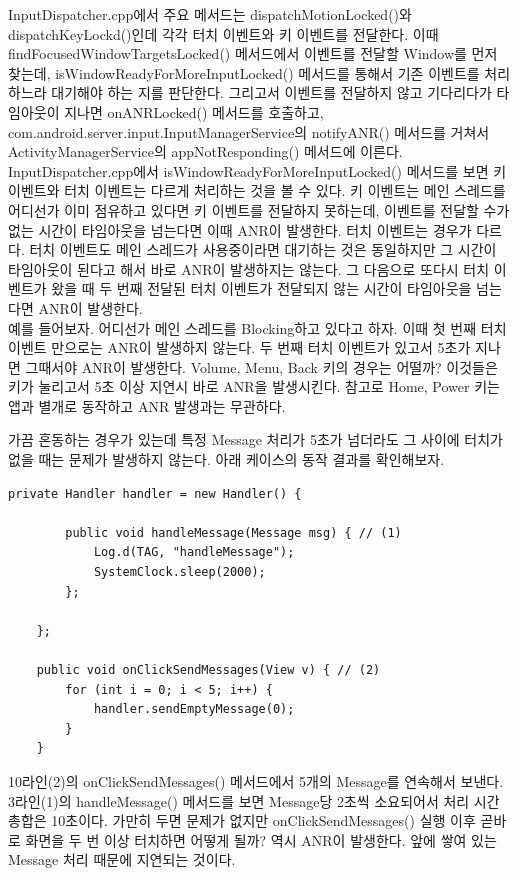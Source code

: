 InputDispatcher.cpp에서 주요 메서드는 dispatchMotionLocked()와 dispatchKeyLockd()인데 각각 터치 이벤트와 키 이벤트를 전달한다. 
이때 findFocusedWindowTargetsLocked() 메서드에서 이벤트를 전달할 Window를 먼저 찾는데, isWindowReadyForMoreInputLocked() 메서드를 통해서 기존 이벤트를 처리하느라 대기해야 하는 지를 판단한다.
그리고서 이벤트를 전달하지 않고 기다리다가 타임아웃이 지나면 onANRLocked() 메서드를 호출하고, com.android.server.input.InputManagerSer\-vice의 notifyANR() 메서드를 거쳐서 ActivityManagerService의 appNotResponding() 메서드에 이른다.\\

InputDispatcher.cpp에서 isWindowReadyForMoreInputLocked() 메서드를 보면 키 이벤트와 터치 이벤트는 다르게 처리하는 것을 볼 수 있다. 
키 이벤트는 메인 스레드를  어디선가 이미 점유하고 있다면 키 이벤트를 전달하지 못하는데, 이벤트를 전달할 수가 없는 시간이 타임아웃을 넘는다면 이때 ANR이 발생한다. 
터치 이벤트는 경우가 다르다. 터치 이벤트도 메인 스레드가 사용중이라면 대기하는 것은 동일하지만 그 시간이 타임아웃이 된다고 해서 바로 ANR이 발생하지는 않는다. 
그 다음으로  또다시 터치 이벤트가 왔을 때 두 번째 전달된 터치 이벤트가 전달되지 않는 시간이 타임아웃을 넘는다면 ANR이 발생한다.\\

예를 들어보자. 
어디선가 메인 스레드를 Blocking하고 있다고 하자.
이때 첫 번째 터치 이벤트 만으로는 ANR이 발생하지 않는다. 두 번째 터치 이벤트가 있고서 5초가 지나면 그때서야 ANR이 발생한다.
Volume, Menu, Back 키의 경우는 어떨까? 이것들은 키가 눌리고서 5초 이상 지연시 바로 ANR을 발생시킨다.
참고로 Home, Power 키는 앱과 별개로 동작하고 ANR 발생과는 무관하다.\\

가끔 혼동하는 경우가 있는데 특정 Message 처리가 5초가 넘더라도 그 사이에 터치가 없을 때는 문제가 발생하지 않는다. 아래 케이스의 동작 결과를 확인해보자. 
\begin{lstlisting}[frame=single] 
 	private Handler handler = new Handler() {

		public void handleMessage(Message msg) { // (1)
			Log.d(TAG, "handleMessage");
			SystemClock.sleep(2000);
		};

	};

	public void onClickSendMessages(View v) { // (2)
		for (int i = 0; i < 5; i++) {
			handler.sendEmptyMessage(0);
		}
	}
\end{lstlisting}
10라인(2)의 onClickSendMessages() 메서드에서 5개의 Message를 연속해서 보낸다.
3라인(1)의 handleMessage() 메서드를 보면 Message당 2초씩 소요되어서 처리 시간 총합은 10초이다. 
가만히 두면 문제가 없지만 onClickSendMessages() 실행 이후 곧바로 화면을 두 번 이상 터치하면 어떻게 될까? 
역시 ANR이 발생한다. 앞에 쌓여 있는 Message 처리 때문에 지연되는 것이다.\\

